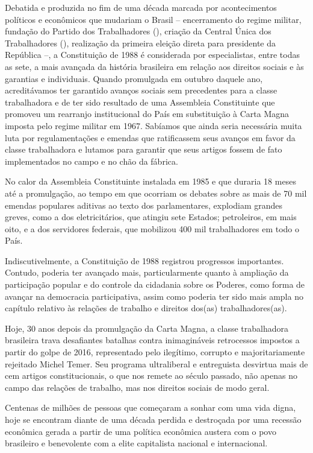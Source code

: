 Debatida e produzida no fim de uma década marcada por acontecimentos
políticos e econômicos que mudariam o Brasil -- encerramento do regime
militar, fundação do Partido dos Trabalhadores (), criação da Central
Única dos Trabalhadores (), realização da primeira eleição direta
para presidente da República --, a Constituição de 1988 é considerada por
especialistas, entre todas as sete, a mais avançada da história
brasileira em relação aos direitos sociais e às garantias e individuais.
Quando promulgada em outubro daquele ano, acreditávamos ter garantido
avanços sociais sem precedentes para a classe trabalhadora e de ter sido
resultado de uma Assembleia Constituinte que promoveu um rearranjo
institucional do País em substituição à Carta Magna imposta pelo regime
militar em 1967. Sabíamos que ainda seria necessária muita luta por
regulamentações e emendas que ratificassem seus avanços em favor da
classe trabalhadora e lutamos para garantir que seus artigos fossem de
fato implementados no campo e no chão da fábrica.

No calor da Assembleia Constituinte instalada em 1985 e que duraria 18
meses até a promulgação, ao tempo em que ocorriam os debates sobre as
mais de 70 mil emendas populares aditivas ao texto dos parlamentares,
explodiam grandes greves, como a dos eletricitários, que atingiu sete
Estados; petroleiros, em mais oito, e a dos servidores federais, que
mobilizou 400 mil trabalhadores em todo o País.

Indiscutivelmente, a Constituição de 1988 registrou progressos
importantes. Contudo, poderia ter avançado mais, particularmente quanto
à ampliação da participação popular e do controle da cidadania sobre os
Poderes, como forma de avançar na democracia participativa, assim como
poderia ter sido mais ampla no capítulo relativo às relações de trabalho
e direitos dos(as) trabalhadores(as).

Hoje, 30 anos depois da promulgação da Carta Magna, a classe
trabalhadora brasileira trava desafiantes batalhas contra inimagináveis
retrocessos impostos a partir do golpe de 2016, representado pelo
ilegítimo, corrupto e majoritariamente rejeitado Michel Temer. Seu
programa ultraliberal e entreguista desvirtua mais de cem artigos
constitucionais, o que nos remete ao século passado, não apenas no campo
das relações de trabalho, mas nos direitos sociais de modo geral.

Centenas de milhões de pessoas que começaram a sonhar com uma vida
digna, hoje se encontram diante de uma década perdida e destroçada por
uma recessão econômica gerada a partir de uma política econômica austera
com o povo brasileiro e benevolente com a elite capitalista nacional e
internacional.

